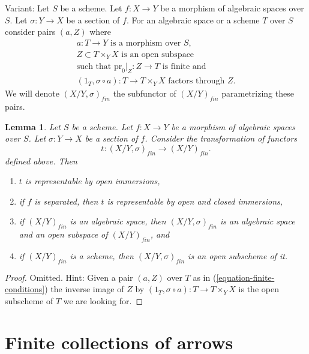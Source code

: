 \documentclass{stacks-project}
\theoremstyle{plain}
\newtheorem{lemma}[subsection]{Lemma}
\theoremstyle{definition}
\theoremstyle{remark}
\numberwithin{equation}{subsection}
\begin{document}
\noindent
Variant: Let $S$ be a scheme.
Let $f : X \to Y$ be a morphism of algebraic spaces over $S$.
Let $\sigma : Y \to X$ be a section of $f$.
For an algebraic space or a scheme $T$ over $S$ consider pairs
$(a, Z)$ where
\begin{equation}
\label{equation-finite-conditions-variant}
\begin{matrix}
a : T \to Y\text{ is a morphism over }S, \\
Z \subset T \times_Y X\text{ is an open subspace} \\
\text{such that }\text{pr}_0|_Z : Z \to T\text{ is finite and} \\
(1_T, \sigma \circ a) : T \to T \times_Y X\text{ factors through }Z.
\end{matrix}
\end{equation}
We will denote $(X/Y, \sigma)_{fin}$ the subfunctor of $(X/Y)_{fin}$
parametrizing these pairs.

\begin{lemma}
\label{lemma-finite-plus-section}
Let $S$ be a scheme.
Let $f : X \to Y$ be a morphism of algebraic spaces over $S$.
Let $\sigma : Y \to X$ be a section of $f$. Consider the
transformation of functors
$$
t : (X/Y, \sigma)_{fin} \longrightarrow (X/Y)_{fin}.
$$
defined above. Then
\begin{enumerate}
\item $t$ is representable by open immersions,
\item if $f$ is separated, then $t$ is representable by open
and closed immersions,
\item if $(X/Y)_{fin}$ is an algebraic space, then
$(X/Y, \sigma)_{fin}$ is an algebraic space and
an open subspace of $(X/Y)_{fin}$, and
\item if $(X/Y)_{fin}$ is a scheme, then $(X/Y, \sigma)_{fin}$ is an
open subscheme of it.
\end{enumerate}
\end{lemma}

\begin{proof}
Omitted. Hint: Given a pair $(a, Z)$ over $T$ as in
(\ref{equation-finite-conditions}) the inverse image of
$Z$ by $(1_T, \sigma \circ a) : T \to T \times_Y X$ is the open
subscheme of $T$ we are looking for.
\end{proof}





\section{Finite collections of arrows}
\label{section-finite-set-arrows}
\end{document}
